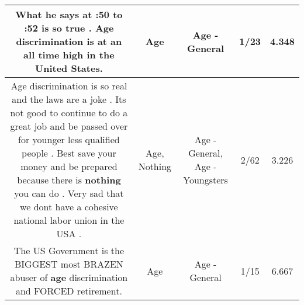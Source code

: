 \documentclass[11pt]{article}
\newlength\mylength
\begin{document}
\begin{center}
\begin{longtable}{|C{.65\mylength}|C{.30\mylength}|C{.12\mylength}|C{.12\mylength}|C{.12\mylength}|}
  \small What he says at :50 to :52 is so true . \textbf{Age} discrimination is at an all time high in the United States.\normalsize   & Age & Age - General & 1/23 & 4.348 \\  \hline
  \small Age discrimination is so real and the laws are a joke . Its not good to continue to do a great job and be passed over for younger less qualified people . Best save your money and be prepared  because there is \textbf{nothing} you can do . Very sad that we dont have a cohesive national labor union in the USA .\normalsize   & Age, Nothing & Age - General, Age - Youngsters & 2/62 & 3.226 \\  \hline
  \small The US Government is the BIGGEST most BRAZEN abuser of \textbf{age} discrimination and FORCED retirement.\normalsize   & Age & Age - General & 1/15 & 6.667 \\  \hline

\end{longtable}
\end{center}
\end{document}

